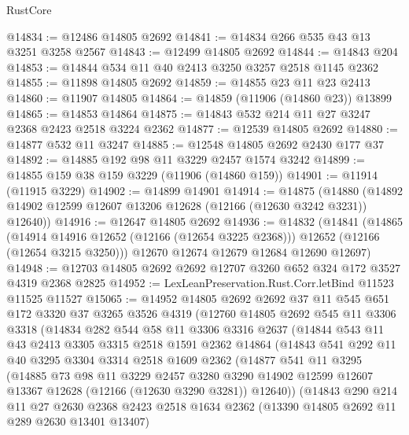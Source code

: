 \begin{lexlean}{RustCore}
\begin{coremodule}
@14834 := @12486 @14805 @2692
@14841 := @14834 @266 @535 @43 @13 @3251 @3258 @2567
@14843 := @12499 @14805 @2692
@14844 := @14843 @204
@14853 := @14844 @534 @11 @40 @2413 @3250 @3257 @2518 @1145 @2362
@14855 := @11898 @14805 @2692
@14859 := @14855 @23 @11 @23 @2413
@14860 := @11907 @14805
@14864 := @14859 (@11906 (@14860 @23)) @13899
@14865 := @14853 @14864
@14875 := @14843 @532 @214 @11 @27 @3247 @2368 @2423 @2518 @3224 @2362
@14877 := @12539 @14805 @2692
@14880 := @14877 @532 @11 @3247
@14885 := @12548 @14805 @2692 @2430 @177 @37
@14892 := @14885 @192 @98 @11 @3229 @2457 @1574 @3242
@14899 := @14855 @159 @38 @159 @3229 (@11906 (@14860 @159))
@14901 := @11914 (@11915 @3229)
@14902 := @14899 @14901
@14914 := @14875
    (@14880 (@14892 @14902 @12599 @12607 @13206 @12628 (@12166 (@12630 @3242 @3231)) @12640))
@14916 := @12647 @14805 @2692
@14936 := @14832
    (@14841
      (@14865
        (@14914 @14916 @12652 (@12166 (@12654 @3225 @2368)))
        @12652
        (@12166 (@12654 @3215 @3250)))
      @12670
      @12674
      @12679
      @12684
      @12690
      @12697)
@14948 := @12703 @14805 @2692 @2692 @12707 @3260 @652 @324 @172 @3527 @4319 @2368 @2825
@14952 := LexLeanPreservation.Rust.Corr.letBind @11523 @11525 @11527
@15065 := @14952
    @14805
    @2692
    @2692
    @37
    @11
    @545
    @651
    @172
    @3320
    @37
    @3265
    @3526
    @4319
    (@12760
      @14805
      @2692
      @545
      @11
      @3306
      @3318
      (@14834
        @282
        @544
        @58
        @11
        @3306
        @3316
        @2637
        (@14844
          @543
          @11
          @43
          @2413
          @3305
          @3315
          @2518
          @1591
          @2362
          @14864
          (@14843
            @541
            @292
            @11
            @40
            @3295
            @3304
            @3314
            @2518
            @1609
            @2362
            (@14877
              @541
              @11
              @3295
              (@14885
                @73
                @98
                @11
                @3229
                @2457
                @3280
                @3290
                @14902
                @12599
                @12607
                @13367
                @12628
                (@12166 (@12630 @3290 @3281))
                @12640))
            (@14843
              @290
              @214
              @11
              @27
              @2630
              @2368
              @2423
              @2518
              @1634
              @2362
              (@13390 @14805 @2692 @11 @289 @2630 @13401 @13407)

\end{coremodule}
\end{lexlean}
